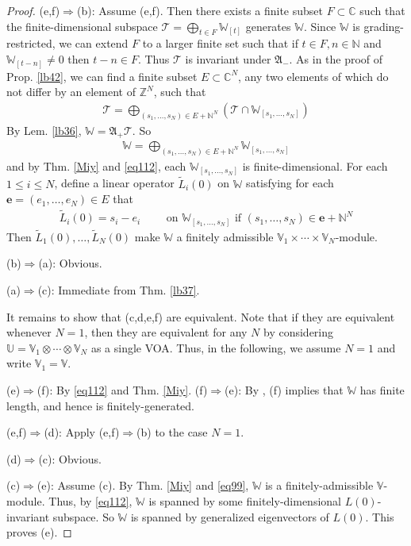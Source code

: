 \documentclass[11pt,b5paper,notitlepage]{article}
\theoremstyle{definition}
\theoremstyle{plain}
\newcommand{\fk}{\mathfrak}
\newcommand{\mc}{\mathcal}
\newcommand{\wtd}{\widetilde}
\newcommand{\mbf}{\mathbf}
\newcommand{\Vbb}{\mathbb V}
\newcommand{\Ubb}{\mathbb U}
\newcommand{\Wbb}{\mathbb W}
\newcommand{\Cbb}{\mathbb C}
\newcommand{\Nbb}{\mathbb N}
\newcommand{\Zbb}{\mathbb Z}
\newcommand{\<}{\left\langle}
\renewcommand{\>}{\right\rangle}
\numberwithin{equation}{section}
\begin{document}
\begin{proof}
(e,f)$\Rightarrow$(b): Assume (e,f). Then there exists a finite subset $F\subset\Cbb$ such that the finite-dimensional subspace $\mc T=\bigoplus_{t\in F}\Wbb_{[t]}$ generates $\Wbb$. Since $\Wbb$ is grading-restricted, we can extend $F$ to a larger finite set such that if $t\in F,n\in\Nbb$ and $\Wbb_{[t-n]}\neq 0$ then $t-n\in F$. Thus $\mc T$ is invariant under $\fk A_-$. As in the proof of Prop. \ref{lb42}, we can find a finite subset $E\subset\Cbb^N$, any two elements of which do not differ by an element of $\Zbb^N$, such that
\begin{align*}
\mc T=\bigoplus_{(s_1,\dots,s_N)\in E+\Nbb^N} (\mc T\cap\Wbb_{[s_1,\dots,s_N]})
\end{align*}
By Lem. \ref{lb36}, $\Wbb=\fk A_+\mc T$. So
\begin{align*}
\Wbb=\bigoplus_{(s_1,\dots,s_N)\in E+\Nbb^N}\Wbb_{[s_1,\dots,s_N]}
\end{align*}
and by Thm. \ref{Miy} and \eqref{eq112}, each $\Wbb_{[s_1,\dots,s_N]}$ is finite-dimensional. For each $1\leq i\leq N$, define a linear operator $\wtd L_i(0)$ on $\Wbb$ satisfying for each $\mbf e=(e_1,\dots,e_N)\in E$ that
\begin{align*}
\wtd L_i(0)=s_i-e_i \qquad\text{ on }\Wbb_{[s_1,\dots,s_N]}\text{ if } (s_1,\dots,s_N)\in\mbf e+\Nbb^N
\end{align*} 
Then $\wtd L_1(0),\dots,\wtd L_N(0)$ make $\Wbb$ a finitely admissible $\Vbb_1\times\cdots\times\Vbb_N$-module.

(b)$\Rightarrow$(a): Obvious. 

(a)$\Rightarrow$(c): Immediate from Thm. \ref{lb37}.


It remains to show that (c,d,e,f) are equivalent. Note that if they are equivalent whenever $N=1$, then they are equivalent for any $N$ by considering $\Ubb=\Vbb_1\otimes\cdots\otimes\Vbb_N$ as a single VOA. Thus, in the following, we assume $N=1$ and write $\Vbb_1=\Vbb$.

(e)$\Rightarrow$(f): By \eqref{eq112} and Thm. \ref{Miy}. (f)$\Rightarrow$(e): By \cite[Prop. 4.3]{Hua-projectivecover}, (f) implies that $\Wbb$ has finite length, and hence is finitely-generated.

(e,f)$\Rightarrow$(d): Apply (e,f)$\Rightarrow$(b) to the case $N=1$.

(d)$\Rightarrow$(c): Obvious.

(c)$\Rightarrow$(e): Assume (c). By Thm. \ref{Miy} and \eqref{eq99}, $\Wbb$ is a finitely-admissible $\Vbb$-module. Thus, by \eqref{eq112}, $\Wbb$ is spanned by some finitely-dimensional $L(0)$-invariant subspace. So $\Wbb$ is spanned by generalized eigenvectors of $L(0)$. This proves (e).
\end{proof}
\end{document}
